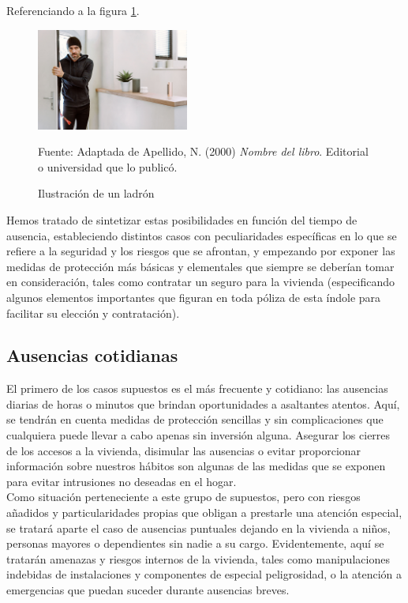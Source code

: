 Referenciando a la figura \ref{fig:ejemplo}.
\begin{figure}[H]
    \begin{center}
        \includegraphics[width=5cm]{img/capitulo_3/intruso.jpg}
    \end{center}
    \caption{Ilustración de un ladrón}
    Fuente: Adaptada de Apellido, N. (2000) \textit{Nombre del libro}.
    Editorial o universidad que lo publicó.
    \label{fig:ejemplo}
\end{figure}
 
Hemos tratado de sintetizar estas posibilidades en función del tiempo de ausencia, estableciendo distintos casos con peculiaridades específicas en lo que se refiere a la seguridad y los riesgos que se afrontan, y empezando por exponer las medidas de protección más básicas y elementales que siempre se deberían tomar en consideración, tales como contratar un seguro para la vivienda (especificando algunos elementos importantes que figuran en toda póliza de esta índole para facilitar su elección y contratación).\\

\subsection{Ausencias cotidianas}
El primero de los casos supuestos es el más frecuente y cotidiano: las ausencias diarias de horas o minutos que brindan oportunidades a asaltantes atentos. Aquí, se tendrán en cuenta medidas de protección sencillas y sin complicaciones que cualquiera puede llevar a cabo apenas sin inversión alguna. Asegurar los cierres de los accesos a la vivienda, disimular las ausencias o evitar proporcionar información sobre nuestros hábitos son algunas de las medidas que se exponen para evitar intrusiones no deseadas en el hogar.\\
 
Como situación perteneciente a este grupo de supuestos, pero con riesgos añadidos y particularidades propias que obligan a prestarle una atención especial, se tratará aparte el caso de ausencias puntuales dejando en la vivienda a niños, personas mayores o dependientes sin nadie a su cargo. Evidentemente, aquí se tratarán amenazas y riesgos internos de la vivienda, tales como manipulaciones indebidas de instalaciones y componentes de especial peligrosidad, o la atención a emergencias que puedan suceder durante ausencias breves.\\

